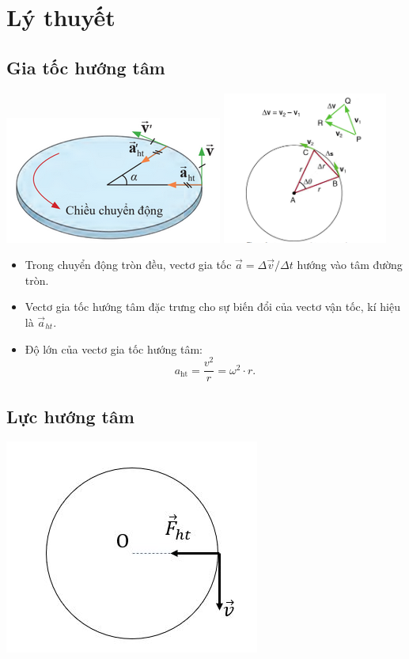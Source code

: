 \setcounter{section}{0}
\section{Lý thuyết}
\subsection{Gia tốc hướng tâm}
\begin{center}
	\includegraphics[scale=1]{../figs/G10-027-1}
	\includegraphics[height=5cm]{../figs/G10-027-1b}
\end{center}

\begin{itemize}
	\item Trong chuyển động tròn đều, vectơ gia tốc $\vec{a}=\Delta\vec{v}/\Delta t$  hướng vào  tâm đường tròn.
	\item Vectơ gia tốc hướng tâm đặc trưng cho sự biến đổi của vectơ vận tốc, kí hiệu là $\vec{a}_{ht}$.
	\item Độ lớn của vectơ gia tốc hướng tâm:
	\begin{equation*}
		a_\text{ht}=\frac{v^2}{r}=\omega^2 \cdot r.
	\end{equation*}
\end{itemize}
\subsection{Lực hướng tâm}
\begin{center}
	\includegraphics[scale=0.6]{../figs/VN10-PH-16-L-013-1-V2-04.JPG}
\end{center}
